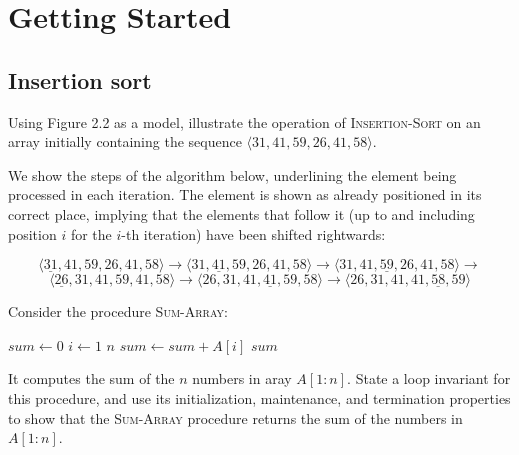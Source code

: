 \chapter{Getting Started}

\section{Insertion sort}

\begin{exercise}{1}
    Using Figure 2.2 as a model, illustrate the operation of I\textsc{nsertion-}S\textsc{ort} on an array initially containing the sequence $\langle 31, 41, 59, 26,41, 58\rangle$.
\end{exercise}

\begin{solution}

    We show the steps of the algorithm below, underlining the element being processed in each iteration.
    The element is shown as already positioned in its correct place, implying that the elements that follow it (up to and including position $i$ for the $i$-th iteration) have been shifted rightwards:

    \[\langle \underline{31}, 41, 59, 26,41, 58\rangle \rightarrow \langle 31, \underline{41}, 59, 26,41, 58\rangle \rightarrow  \langle 31, 41, \underline{59}, 26,41, 58\rangle \rightarrow\]
    \[\langle \underline{26}, 31, 41, 59, 41, 58\rangle \rightarrow
    \langle 26, 31, 41, \underline{41}, 59, 58\rangle \rightarrow
    \langle 26, 31, 41, 41, \underline{58}, 59\rangle\]
\end{solution}

\begin{exercise}{2}
    Consider the procedure S\textsc{um-}A\textsc{rray}:

    \begin{codebox}
        \li $sum \gets 0$
        \li \For $i \gets 1$ \To $n$
        \li  \Do $sum \gets sum + A[i]$
        \End
        \li \Return $sum$
    \end{codebox}

    It computes the sum of the $n$ numbers in aray $A[1:n]$.
    State a loop invariant for this procedure, and use its initialization, maintenance, and termination properties to show that the S\textsc{um-}A\textsc{rray} procedure returns the sum of the numbers in $A[1:n]$.
\end{exercise}

